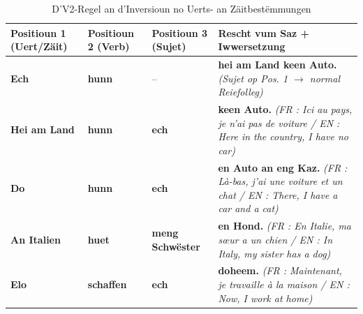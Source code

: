 \begin{itemize}
    \begin{table}[htbp]
        \centering
        \begin{tabular}{p{3.4cm}p{2.3cm}p{2.8cm}p{5.5cm}}
            \toprule
            \textbf{Positioun 1 (Uert/Zäit)} & \textbf{Positioun 2 (Verb)} & \textbf{Positioun 3 (Sujet)} & \textbf{Rescht vum Saz + Iwwersetzung} \\
            \midrule
            \textbf{Ech} & \textbf{hunn} & -- & \textbf{hei am Land keen Auto.} \newline \footnotesize\textit{(Sujet op Pos. 1 $\rightarrow$ normal Reiefolleg)} \\
            \midrule
            \textbf{Hei am Land} & \textbf{hunn} & \textbf{ech} & \textbf{keen Auto.} \newline \footnotesize\textit{(FR : Ici au pays, je n'ai pas de voiture / EN : Here in the country, I have no car)} \\
            \midrule
            \textbf{Do} & \textbf{hunn} & \textbf{ech} & \textbf{en Auto an eng Kaz.} \newline \footnotesize\textit{(FR : Là-bas, j'ai une voiture et un chat / EN : There, I have a car and a cat)} \\
            \midrule
            \textbf{An Italien} & \textbf{huet} & \textbf{meng Schwëster} & \textbf{en Hond.} \newline \footnotesize\textit{(FR : En Italie, ma sœur a un chien / EN : In Italy, my sister has a dog)} \\
            \midrule
            \textbf{Elo} & \textbf{schaffen} & \textbf{ech} & \textbf{doheem.} \newline \footnotesize\textit{(FR : Maintenant, je travaille à la maison / EN : Now, I work at home)} \\
            \bottomrule
        \end{tabular}
        \caption{D'V2-Regel an d'Inversioun no Uerts- an Zäitbestëmmungen}
    \end{table}


\end{itemize}
